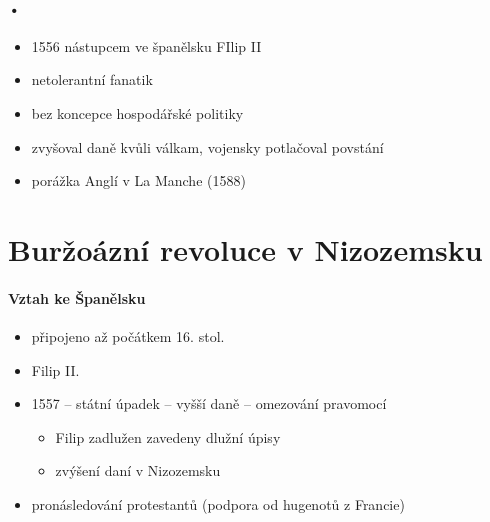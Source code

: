 \paragraph{•}
\begin{itemize}
\item 1556 nástupcem ve španělsku FIlip II
\item netolerantní fanatik
\item bez koncepce hospodářské politiky
\item zvyšoval daně kvůli válkam, vojensky potlačoval povstání
\item porážka Anglí v La Manche (1588)
\end{itemize}

\section{Buržoázní revoluce v Nizozemsku}
\paragraph{Vztah ke Španělsku}
\begin{itemize}
\item připojeno až počátkem 16. stol.
\item Filip II. 
\item 1557 -- státní úpadek -- vyšší daně -- omezování pravomocí
	\begin{itemize}
	\item Filip zadlužen \ra zavedeny dlužní úpisy
	\item zvýšení daní v Nizozemsku
	\end{itemize}
\item pronásledování protestantů (podpora od hugenotů z Francie)

\end{itemize}

